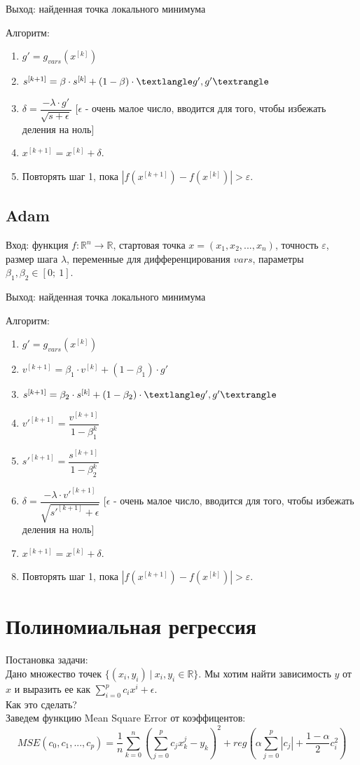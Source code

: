 \documentclass[a4paper,14pt,oneside,openany]{memoir}
\begin{document}
Выход: найденная точка локального минимума

Алгоритм:
\begin{enumerate}
	\item $g' = g_{vars}(x^{[k]})$
	\item $s^{[k + 1]} = \beta \cdot s^{[k]} + (1 - \beta) \cdot \textlangle g', g' \textrangle$
	\item $\delta = \dfrac{-\lambda \cdot g'}{\sqrt{s + \epsilon}} $ [$\epsilon$ - очень малое число, вводится для того, чтобы избежать деления на ноль]
	\item $x^{[k+1]} = x^{[k]} + \delta$.
	\item Повторять шаг 1, пока  $|f(x^{[k+1]}) - f(x^{[k]})| > \varepsilon$.
\end{enumerate}

\subsection{Adam}
Вход: функция $f:\mathbb{R}^n \rightarrow \mathbb{R}$, стартовая точка $x = (x_1,x_2,...,x_n)$, точность $\varepsilon$, размер шага $\lambda$, переменные для дифференцирования $vars$, параметры $\beta_1, \beta_2 \in [0;\ 1]$.

Выход: найденная точка локального минимума

Алгоритм:
\begin{enumerate}
	\item $g' = g_{vars}(x^{[k]})$
	\item $v^{[k + 1]} = \beta_1 \cdot v^{[k]} + (1 - \beta_1) \cdot g'$
	\item $s^{[k + 1]} = \beta_2 \cdot s^{[k]} + (1 - \beta_2) \cdot \textlangle g', g' \textrangle$
	\item $v'^{[k + 1]} = \dfrac{v^{[k + 1]}}{1 - \beta_1^k}$
	\item $s'^{[k + 1]} = \dfrac{s^{[k + 1]}}{1 - \beta_2^k}$
	\item $\delta = \dfrac{-\lambda \cdot v'^{[k + 1]}}{\sqrt{s'^{[k + 1]} + \epsilon}} $ [$\epsilon$ - очень малое число, вводится для того, чтобы избежать деления на ноль]
	\item $x^{[k+1]} = x^{[k]} + \delta$.
	\item Повторять шаг 1, пока  $|f(x^{[k+1]}) - f(x^{[k]})| > \varepsilon$.
\end{enumerate}
\newpage
\section{Полиномиальная регрессия}
\quad\quad Постановка задачи: \\
Дано множество точек $\{(x_i, y_i)\ |\ x_i, y_i \in \mathbb{R}\}$.
Мы хотим найти зависимость $y$ от $x$ и выразить ее как $\sum_{i=0}^{p} c_ix^i + \epsilon.$ \\
Как это сделать? \\
Заведем функцию Mean Square Error от коэффицентов: 
$$MSE(c_0, c_1, ..., c_p) = \dfrac{1}{n}\sum_{k = 0}^{n} (\sum_{j = 0}^{p}c_jx^j_k - y_k)^2 + reg(\alpha \sum_{j = 0}^{p}|c_j| + \dfrac{1 - \alpha}{2}c_i^2)$$ 
\end{document}
